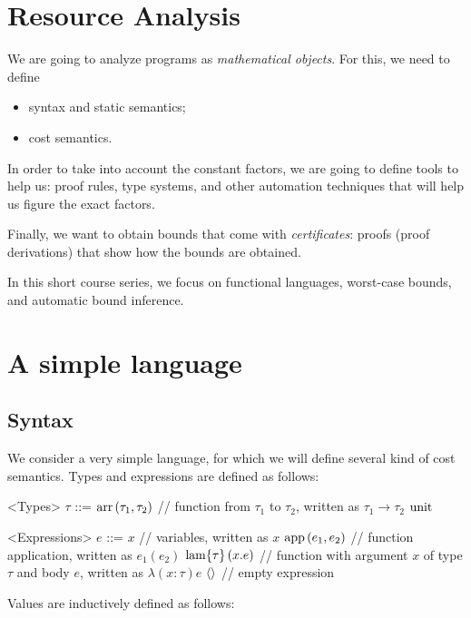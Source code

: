 \documentclass[ manuscript,screen, nonacm]{acmart}
\begin{document}
\section{Resource Analysis}

We are going to analyze programs as \emph{mathematical objects}. For this, we need to define
\begin{itemize}
    \item syntax and static semantics;
    \item cost semantics.
\end{itemize}

In order to take into account the constant factors, we are going to define tools to help us: proof rules,
type systems, and other automation techniques that will help us figure the exact factors.

Finally, we want to obtain bounds that come with \emph{certificates}: proofs (proof derivations) that
show how the bounds are obtained.

In this short course series, we focus on functional languages, worst-case bounds, and automatic bound inference.

\section{A simple language}
\subsection{Syntax}

We consider a very simple language, for which we will define several kind of 
cost semantics. Types and expressions are defined as follows:
\begin{grammar}
<Types> $\tau$ ::= $\mathrm{arr}\left(\tau_1,\tau_2\right)$ // function from $\tau_1$ to $\tau_2$, written as $\tau_1 \rightarrow \tau_2$
\alt $\mathrm{unit}$

<Expressions> $e$ ::= $x$ // variables, written as $x$
\alt $\mathrm{app}\left(e_1,e_2\right)$  // function application, written as $e_1(e_2)$
\alt $\mathrm{lam}\{\tau\}\left(x.e\right)$ // function with argument $x$ of type $\tau$ and body $e$, written as $\lambda(x:\tau)e$
\alt $\langle\rangle$   // empty expression
\end{grammar}

Values are inductively defined as follows:
\end{document}
